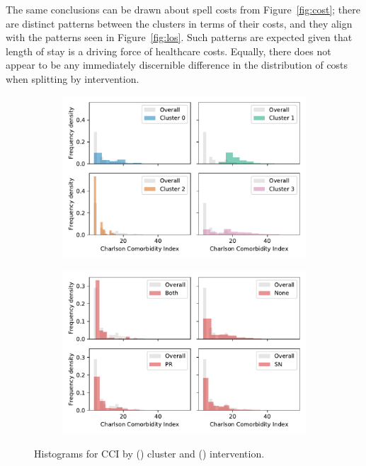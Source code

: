 The same conclusions can be drawn about spell costs from Figure~\ref{fig:cost};
there are distinct patterns between the clusters in terms of their costs, and
they align with the patterns seen in Figure~\ref{fig:los}. Such patterns are
expected given that length of stay is a driving force of healthcare costs.
Equally, there does not appear to be any immediately discernible difference in
the distribution of costs when splitting by intervention.

\begin{figure}
    \centering
    \begin{subfigure}{.5\imgwidth}
        \includegraphics[width=\linewidth]{cluster_charlson_gross}
        \caption{}\label{fig:cluster_charlson}
    \end{subfigure}\hfill%
    \begin{subfigure}{.5\imgwidth}
        \includegraphics[width=\linewidth]{intervention_charlson_gross}
        \caption{}\label{fig:intervention_charlson}
    \end{subfigure}
    \caption{%
        Histograms for CCI by () cluster and
        () intervention.
    }\label{fig:charlson}
\end{figure}

